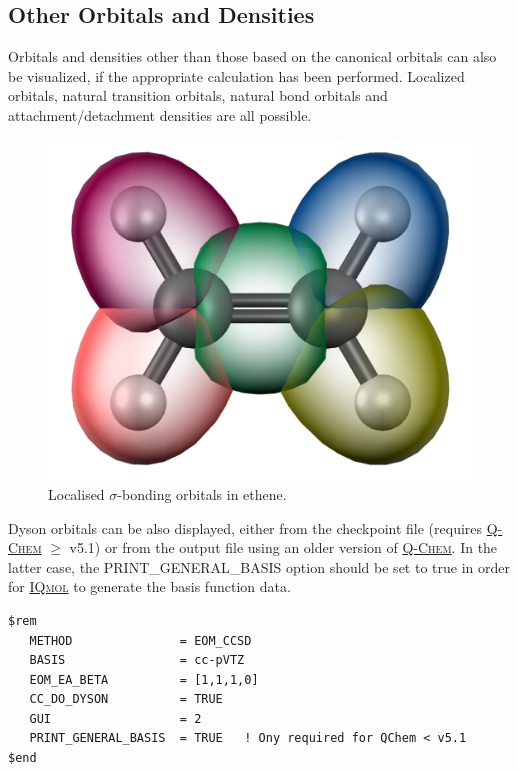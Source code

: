\documentclass[a4paper,12pt]{article}
\newcommand{\qchem}{\href{http://q-chem.com}{{\scshape Q-Chem}}}
\newcommand{\iqmol}{\href{http://iqmol.org}{{\scshape IQmol}}}
\begin{document}
\subsection{Other Orbitals and Densities}

Orbitals and densities other than those based on the canonical orbitals can
also be visualized, if the appropriate calculation has been performed.  Localized
orbitals, natural transition orbitals, natural bond orbitals and
attachment/detachment densities are all possible.

\begin{figure}[h]
\begin{center}
\includegraphics[scale=0.25]{figures/LocalizedBonds.png}
\caption{Localised $\sigma$-bonding orbitals in ethene.}
\label{fig:mo}
\end{center}
\end{figure}

Dyson orbitals can be also displayed, either from the checkpoint file (requires
\qchem{} $\ge$ v5.1) or from the output file using an older version of \qchem{}.
In the latter case, the PRINT\_GENERAL\_BASIS option should be set to true in
order for \iqmol{} to generate the basis function data.

{\small
\begin{verbatim}
$rem
   METHOD               = EOM_CCSD
   BASIS                = cc-pVTZ
   EOM_EA_BETA          = [1,1,1,0]
   CC_DO_DYSON          = TRUE
   GUI                  = 2
   PRINT_GENERAL_BASIS  = TRUE   ! Ony required for QChem < v5.1
$end
\end{verbatim}
}
\end{document}
